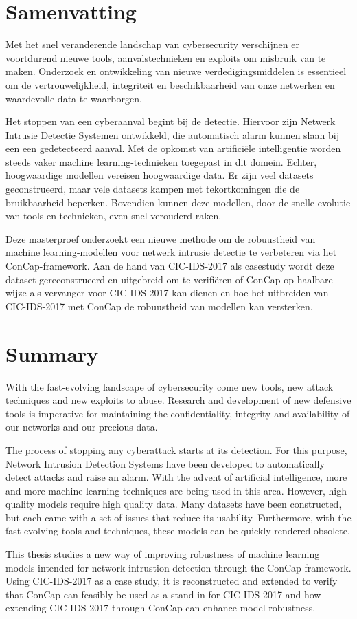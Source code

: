 \documentclass[english]{article}
\begin{document}
	\section*{Samenvatting}	
	Met het snel veranderende landschap van cybersecurity verschijnen er voortdurend nieuwe tools, aanvalstechnieken en exploits om misbruik van te maken. Onderzoek en ontwikkeling van nieuwe verdedigingsmiddelen is essentieel om de vertrouwelijkheid, integriteit en beschikbaarheid van onze netwerken en waardevolle data te waarborgen.
	
	Het stoppen van een cyberaanval begint bij de detectie. Hiervoor zijn Netwerk Intrusie Detectie Systemen ontwikkeld, die automatisch alarm kunnen slaan bij een een gedetecteerd aanval. Met de opkomst van artificiële intelligentie worden steeds vaker machine learning-technieken toegepast in dit domein. Echter, hoogwaardige modellen vereisen hoogwaardige data. Er zijn veel datasets geconstrueerd, maar vele datasets kampen met tekortkomingen die de bruikbaarheid beperken. Bovendien kunnen deze modellen, door de snelle evolutie van tools en technieken, even snel verouderd raken.
	
	Deze masterproef onderzoekt een nieuwe methode om de robuustheid van machine learning-modellen voor netwerk intrusie detectie te verbeteren via het ConCap-framework. Aan de hand van CIC-IDS-2017 als casestudy wordt deze dataset gereconstrueerd en uitgebreid om te verifiëren of ConCap op haalbare wijze als vervanger voor CIC-IDS-2017 kan dienen en hoe het uitbreiden van CIC-IDS-2017 met ConCap de robuustheid van modellen kan versterken.
	\newpage
	\section*{Summary}
	With the fast-evolving landscape of cybersecurity come new tools, new attack techniques and new exploits to abuse. Research and development of new defensive tools is imperative for maintaining the confidentiality, integrity and availability of our networks and our precious data. 
	
	The process of stopping any cyberattack starts at its detection. For this purpose, Network Intrusion Detection Systems have been developed to automatically detect attacks and raise an alarm. With the advent of artificial intelligence, more and more machine learning techniques are being used in this area. However, high quality models require high quality data. Many datasets have been constructed, but each came with a set of issues that reduce its usability. Furthermore, with the fast evolving tools and techniques, these models can be quickly rendered obsolete.
	
	This thesis studies a new way of improving robustness of machine learning models intended for network intrustion detection through the ConCap framework. Using CIC-IDS-2017 as a case study, it is reconstructed and extended to verify that ConCap can feasibly be used as a stand-in for CIC-IDS-2017 and how extending CIC-IDS-2017 through ConCap can enhance model robustness.
	
\end{document}
